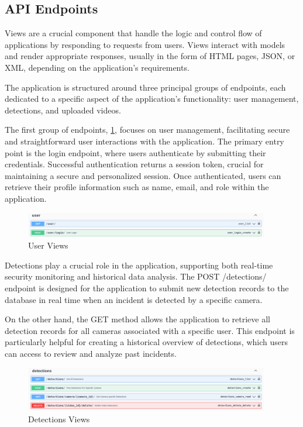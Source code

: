 \subsection{API Endpoints}
Views are a crucial component that handle the logic and control flow of applications by responding to requests from users.
Views interact with models and render appropriate responses, usually in the form of HTML pages, JSON, or XML, depending 
on the application's requirements.

The application is structured around three principal groups of endpoints, each dedicated to a specific aspect of 
the application's functionality: user management, detections, and uploaded videos. 

The first group of endpoints, \ref{fig:views-user}, focuses on user management, facilitating secure and straightforward user 
interactions with the application. The primary entry point is the login endpoint, where users authenticate by 
submitting their credentials. Successful authentication returns a session token, crucial for maintaining a 
secure and personalized session. Once authenticated, users can retrieve their profile information such as 
name, email, and role within the application.

\begin{figure}[h]
    \centering 
    \includegraphics[width=0.95\textwidth]{figs/views-user.png} 
    \caption{User Views}
    \label{fig:views-user}
\end{figure}

Detections play a crucial role in the application, supporting both real-time security monitoring and 
historical data analysis. The POST /detections/ endpoint is designed for the application to 
submit new detection records to the database in real time when an incident is detected by a specific camera.

On the other hand, the GET method allows the application to retrieve all detection records for all cameras associated 
with a specific user. This endpoint is particularly helpful for creating a historical overview of detections,
which users can access to review and analyze past incidents.

\begin{figure}[h]
    \centering 
    \includegraphics[width=0.95\textwidth]{figs/views-detections.png} 
    \caption{Detections Views}
    \label{fig:views-detections}
\end{figure}

